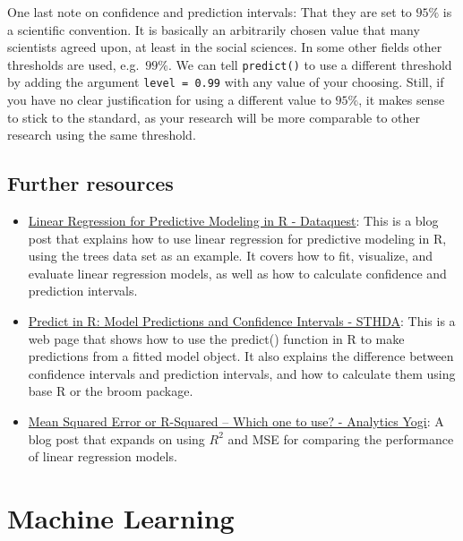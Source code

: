 \documentclass[
]{book}
\providecommand{\tightlist}{%
  \setlength{\itemsep}{0pt}\setlength{\parskip}{0pt}}
\begin{document}
One last note on confidence and prediction intervals: That they are set to
\(95\%\) is a scientific convention. It is basically an arbitrarily chosen value
that many scientists agreed upon, at least in the social sciences. In some other
fields other thresholds are used, e.g.~\(99\%\). We can tell \texttt{predict()} to
use a different threshold by adding the argument \texttt{level\ =\ 0.99} with any
value of your choosing. Still, if you have no clear justification for using a
different value to \(95\%\), it makes sense to stick to the standard, as your
research will be more comparable to other research using the same threshold.

\hypertarget{further-resources-2}{%
\section{Further resources}\label{further-resources-2}}

\begin{itemize}
\tightlist
\item
  \href{https://www.dataquest.io/blog/statistical-learning-for-predictive-modeling-r/}{Linear Regression for Predictive Modeling in R - Dataquest}: This is a blog post that explains how to use linear regression for predictive modeling in R, using the trees data set as an example. It covers how to fit, visualize, and evaluate linear regression models, as well as how to calculate confidence and prediction intervals.
\item
  \href{http://www.sthda.com/english/articles/40-regression-analysis/166-predict-in-r-model-predictions-and-confidence-intervals/}{Predict in R: Model Predictions and Confidence Intervals - STHDA}: This is a web page that shows how to use the predict() function in R to make predictions from a fitted model object. It also explains the difference between confidence intervals and prediction intervals, and how to calculate them using base R or the broom package.
\item
  \href{https://vitalflux.com/mean-square-error-r-squared-which-one-to-use/}{Mean Squared Error or R-Squared -- Which one to use? - Analytics Yogi}: A blog post that expands on using \(R^2\) and MSE for comparing the performance of linear regression models.
\end{itemize}

\hypertarget{ml}{%
\chapter{Machine Learning}\label{ml}}
\end{document}
